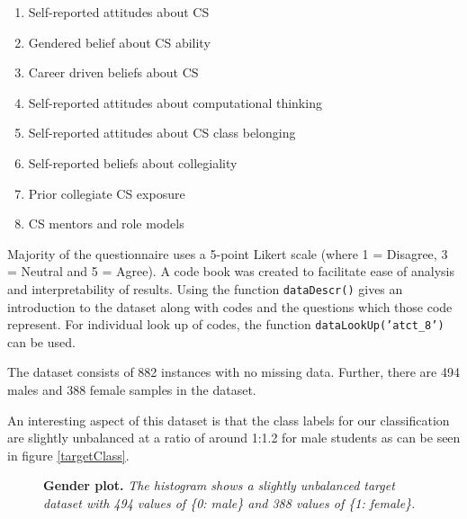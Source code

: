 \begin{enumerate}%
\item Self-reported attitudes about CS
\item Gendered belief about CS ability
\item Career driven beliefs about CS
\item Self-reported attitudes about computational thinking
\item Self-reported attitudes about CS class belonging
\item Self-reported beliefs about collegiality
\item Prior collegiate CS exposure
\item CS mentors and role models
\end{enumerate}



Majority of the questionnaire uses a 5-point Likert scale (where 1 = Disagree, 3 = Neutral and 5 = Agree). A code book was created to facilitate ease of analysis and interpretability of results. Using the function \texttt{dataDescr()} gives an introduction to the dataset along with codes and the questions which those code represent. For individual look up of codes, the function \texttt{dataLookUp('atct\_8')} can be used.

The dataset consists of 882 instances with no missing data. Further, there are 494 males and 388 female samples in the dataset.

An interesting aspect of this dataset is that the class labels for our classification are slightly unbalanced at a ratio of around 1:1.2 for male students as can be seen in figure \ref{targetClass}. 

\begin{figure}[!hbtp]
\centering
    
    \caption{\textbf{Gender plot. }\textit{The histogram shows a slightly unbalanced target dataset with 494 values of \{0: male\} and 388 values of \{1: female\}.}}
\end{figure}



